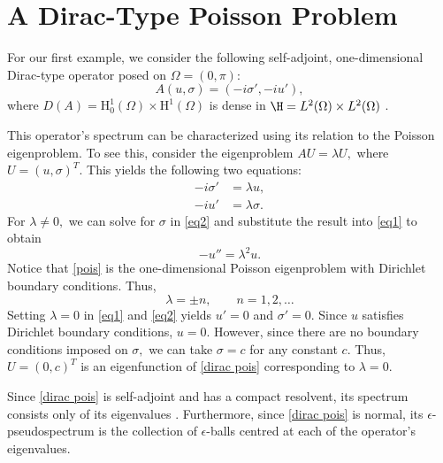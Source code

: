 \section{A Dirac-Type Poisson Problem}

For our first example, we consider the following self-adjoint, one-dimensional
Dirac-type operator posed on $\Omega=(0,\pi)$:
\begin{equation} \label{dirac pois}
    A(u, \sigma) = (-i\sigma', -i u'), 
\end{equation}
where  $D(A) = \text{H}_0^1(\Omega) \times \text{H}^1(\Omega)$ is dense in $\H = L^2(\Omega) \times L^2(\Omega)$ \cite{dirac}.

This operator's spectrum can be characterized using its relation to the Poisson eigenproblem. To see this, consider the eigenproblem $AU = \lambda U,$ where $U = (u, \sigma)^T\!.$ This yields the following two equations:
\begin{align}
-i \sigma' &= \lambda u, \label{eq1}\\
-i u' &= \lambda \sigma. \label{eq2}
\end{align}
For $\lambda \ne 0,$ we can solve for $\sigma$ in \eqref{eq2} and substitute the result into \eqref{eq1} to obtain 
\begin{equation} \label{pois}
    -u'' = \lambda^2u.
\end{equation}
Notice that \eqref{pois} is the one-dimensional Poisson eigenproblem with Dirichlet boundary conditions. Thus, 
\begin{equation} \label{eigs dirac}
    \lambda = \pm n, \qquad n = 1, 2, \dots
\end{equation}
 Setting $\lambda = 0$ in \eqref{eq1} and \eqref{eq2} yields $u'=0$ and $\sigma'=0.$ Since $u$ satisfies Dirichlet boundary conditions, $u=0.$ However, since there are no boundary conditions imposed on $\sigma,$ we can take $\sigma = c$ for any constant $c.$ Thus, $U = (0, c)^T$ is an eigenfunction of \eqref{dirac pois} corresponding to $\lambda = 0.$ 

Since \eqref{dirac pois} is self-adjoint and has a compact resolvent, its spectrum consists only of its eigenvalues \cite{Resolve}.
Furthermore, since \eqref{dirac pois} is normal, its  $\epsilon$-pseudospectrum is the collection of $\epsilon$-balls centred at each of the operator's eigenvalues. 


